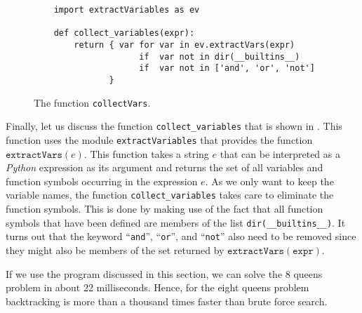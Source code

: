 \begin{figure}[!ht]
\centering
\begin{verbatim}
    import extractVariables as ev
    
    def collect_variables(expr):
        return { var for var in ev.extractVars(expr)
                     if  var not in dir(__builtins__)
                     if  var not in ['and', 'or', 'not']
               }
\end{verbatim}
\vspace*{-0.3cm}
\caption{The function \texttt{collectVars}.}
\label{fig:collect_variables.py}
\end{figure}
Finally, let us discuss the function \texttt{collect\_variables} that is shown in .
This function uses the module \texttt{extractVariables} that provides the function $\texttt{extractVars}(e)$.
This function takes a string $e$ that can be interpreted as a \textsl{Python} expression as its argument and
returns the set of all variables and function symbols occurring in the expression $e$.  As we only want to keep
the variable names, the function \texttt{collect\_variables} takes care to eliminate the function symbols.
This is done by making use of the fact that all function symbols that have been defined are members of the
list \texttt{dir(\_\_builtins\_\_)}.   It turns out that the keyword ``\texttt{and}'', ``\texttt{or}'', and
``\texttt{not}'' also need to be removed since they might also be members of the set returned by
$\texttt{extractVars}(\texttt{expr})$.

If we use the program discussed in this section, we can solve the 8 queens problem in about 22 milliseconds.
Hence, for the eight queens problem backtracking is more than a thousand times faster than brute force search.


